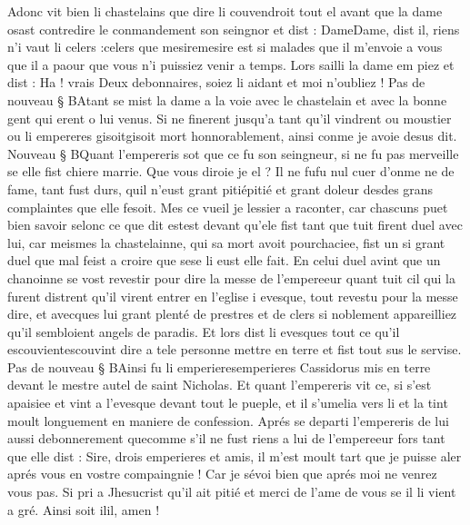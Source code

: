 \documentclass{article}
\begin{document}
\begin{pages}
   Adonc vit bien li chastelains que dire li couvendroit tout 
   el avant que la dame osast contredire le conmandement 
      son seingnor et dist :
   DameDame, dist il, riens n’i vaut li 
      celers :celers que 
      mesiremesire est si malades que il m’envoie a vous que il a paour que 
      vous n’i puissiez venir a temps.
   Lors sailli la dame em piez et dist :
   Ha ! vrais Deux debonnaires, soiez li aidant et moi n’oubliez ! \pend
\pstart Pas de nouveau § BAtant se mist 
   la dame a la voie avec 
   le chastelain et avec la bonne gent qui erent o lui venus. Si ne finerent 
   jusqu’a tant qu’il vindrent ou moustier ou 
   li empereres gisoitgisoit mort 
   honnorablement, ainsi conme je avoie desus dit. 
   Nouveau § BQuant l’empereris sot que ce fu 
   son seingneur, si ne fu pas merveille se elle fist chiere marrie. Que vous diroie je 
   el ? 
   Il ne fufu nul cuer d’onme ne de fame, 
   tant fust durs, quil n’eust grant pitiépitié et grant doleur 
   desdes grans complaintes que elle fesoit. 
   Mes ce vueil je lessier a raconter, car chascuns puet bien savoir selonc ce que dit 
      estest devant qu’ele fist tant que tuit firent duel avec lui, 
   car meismes la chastelainne, qui sa mort avoit pourchaciee, 
   fist un si grant duel que mal feist a croire que sese li eust elle fait. En celui duel avint que un chanoinne se vost revestir 
   pour dire la messe de l’empereeur quant tuit cil qui la furent 
   distrent qu’il virent entrer en 
   l’eglise i evesque, tout revestu pour 
   la messe dire, et avecques lui grant plenté 
   de prestres et de clers si noblement appareilliez 
   qu’il sembloient angels de paradis. Et lors dist li evesques tout ce qu’il 
   escouvientescouvint 
   dire a tele personne mettre en terre 
   et fist tout sus le servise. \pend
\pstart Pas de nouveau § BAinsi fu 
   li emperieresemperieres Cassidorus 
   mis en terre devant le mestre autel de saint Nicholas. 
   Et quant l’empereris vit ce, si s’est apaisiee et 
   vint a l’evesque devant tout le pueple, et il s’umelia vers li et la tint moult longuement 
   en maniere de confession. Aprés se departi l’empereris de lui aussi debonnerement 
   quecomme s’il ne fust riens a lui de 
   l’empereeur fors tant que elle dist :
   Sire, drois emperieres et amis, 
      il m’est moult tart que je puisse aler aprés vous en vostre compaingnie ! 
      Car je sévoi bien que aprés moi ne venrez vous pas. 
      Si pri a Jhesucrist qu’il ait pitié et merci de l’ame de vous se il li vient a gré. Ainsi soit 
         ilil, amen !
 \pend
         

\end{pages}
\end{document}
